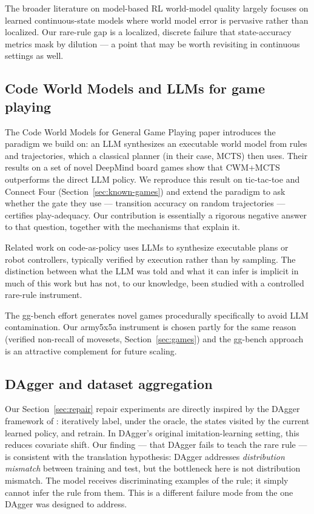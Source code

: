 \documentclass[11pt]{article}
\theoremstyle{remark}
\begin{document}
The broader literature on model-based RL world-model quality \citep[e.g., Dreamer,][]{hafner2020dreamer}\citep[MBPO,][]{janner2019mbpo} largely focuses on learned continuous-state models where world model error is pervasive rather than localized. Our rare-rule gap is a localized, discrete failure that state-accuracy metrics mask by dilution --- a point that may be worth revisiting in continuous settings as well.

\subsection{Code World Models and LLMs for game playing}

The Code World Models for General Game Playing paper \citep{lehrach2025cwm} introduces the paradigm we build on: an LLM synthesizes an executable world model from rules and trajectories, which a classical planner (in their case, MCTS) then uses. Their results on a set of novel DeepMind board games show that CWM+MCTS outperforms the direct LLM policy. We reproduce this result on tic-tac-toe and Connect Four (Section~\ref{sec:known-games}) and extend the paradigm to ask whether the gate they use --- transition accuracy on random trajectories --- certifies play-adequacy. Our contribution is essentially a rigorous negative answer to that question, together with the mechanisms that explain it.

Related work on code-as-policy \citep[e.g.,][]{liang2023codeaspolicies,gao2023pal} uses LLMs to synthesize executable plans or robot controllers, typically verified by execution rather than by sampling. The distinction between what the LLM was told and what it can infer is implicit in much of this work but has not, to our knowledge, been studied with a controlled rare-rule instrument.

The gg-bench effort \citep{ggbench2025} generates novel games procedurally specifically to avoid LLM contamination. Our army5x5a instrument is chosen partly for the same reason (verified non-recall of movesets, Section~\ref{sec:games}) and the gg-bench approach is an attractive complement for future scaling.

\subsection{DAgger and dataset aggregation}

Our Section~\ref{sec:repair} repair experiments are directly inspired by the DAgger framework of \citet{ross2011dagger}: iteratively label, under the oracle, the states visited by the current learned policy, and retrain. In DAgger's original imitation-learning setting, this reduces covariate shift. Our finding --- that DAgger fails to teach the rare rule --- is consistent with the translation hypothesis: DAgger addresses \emph{distribution mismatch} between training and test, but the bottleneck here is not distribution mismatch. The model receives discriminating examples of the rule; it simply cannot infer the rule from them. This is a different failure mode from the one DAgger was designed to address.
\end{document}
